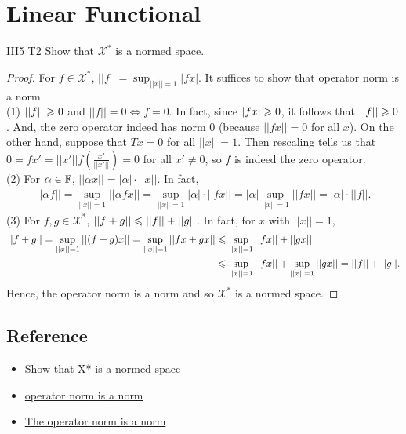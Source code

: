 \chapter{Linear Functional}\label{chp:3_5}

\begin{exercise}{III5 T2}{}
    Show that $\mathscr{X}^*$ is a normed space.
\end{exercise}

\begin{proof}
    For $f\in \mathscr{X}^*$, $||f||=\sup_{||x||= 1}|fx|$.
    It suffices to show that operator norm is a norm. \\
    (1) $||f||\geqslant 0$ and $||f||=0\Leftrightarrow f=0$. In fact, since $|fx|\geqslant 0$, it follows that $||f||\geqslant 0$. 
    And, the zero operator indeed has norm $0$ (because $||fx||=0$ for all $x$). On the other hand,
    suppose that $Tx=0$ for all $||x||=1$. Then rescaling tells us that $0=fx'=||x'||f(\frac{x'}{||x'||})=0$ for all $x'\neq 0$,
    so $f$ is indeed the zero operator.\\
    (2) For $\alpha\in\mathbb{F}$, $||\alpha x||=|\alpha|\cdot||x||$. In fact, 
    \begin{align*}
        ||\alpha f||=\sup_{||x||=1}||\alpha fx||=\sup_{||x||=1}|\alpha|\cdot||fx||=|\alpha| \sup_{||x||=1} ||fx||=|\alpha|\cdot||f||.
    \end{align*} 
    (3) For $f,g\in \mathscr{X}^*$, $||f+g||\leqslant ||f||+||g||$. In fact, for $x$ with $||x||=1$,
    \begin{align*}
        ||f+g||=\sup_{||x||=1}||(f+g)x||=\sup_{||x||=1}||fx+gx||&\leqslant \sup_{||x||=1}||fx||+||gx||\\
                                                                &\leqslant \sup_{||x||=1}||fx|| + \sup_{||x||=1}||gx|| = ||f||+||g||.
    \end{align*}
    Hence, the operator norm is a norm and so $\mathscr{X}^*$ is a normed space.
\end{proof}

\section{Reference}
\begin{itemize}
    \item \href{https://web.eecs.umich.edu/~fessler/course/600/l/l05a.pdf}{Show that X* is a normed space}
    \item \href{https://home.iitk.ac.in/~ketan/courses/698w-s14/operator%20norm%20is%20a%20norm.pdf}{operator norm is a norm}
    \item \href{https://ocw.mit.edu/courses/18-102-introduction-to-functional-analysis-spring-2021/22bf2f774fb161776032491568148707_MIT18_102s21_lec2.pdf}{The operator norm is a norm}
\end{itemize}
